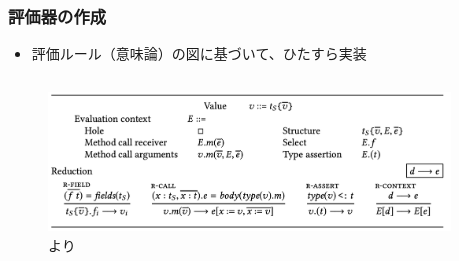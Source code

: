 \begin{frame}
  \frametitle{評価器の作成}

  \pause
  \begin{itemize}
    \item<+-> 評価ルール（意味論）の図に基づいて、ひたすら実装
  \end{itemize}

  \begin{columns}
    \begin{column}{0.65\textwidth}
      \begin{figure}
        \includegraphics[width=\textwidth]{img/eval_rule.png}
        \caption{\cite{griesemer2020featherweight}より}
      \end{figure}
    \end{column}
    \begin{column}{0.35\textwidth}

    \end{column}
  \end{columns}
\end{frame}


